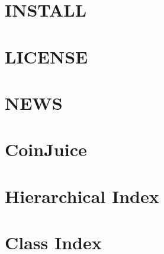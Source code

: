 \documentclass[twoside]{book}
\begin{document}
\chapter{I\-N\-S\-T\-A\-L\-L}
\label{md__i_n_s_t_a_l_l}
\hypertarget{md__i_n_s_t_a_l_l}{}

\chapter{L\-I\-C\-E\-N\-S\-E}
\label{md__l_i_c_e_n_s_e}
\hypertarget{md__l_i_c_e_n_s_e}{}

\chapter{N\-E\-W\-S}
\label{md__n_e_w_s}
\hypertarget{md__n_e_w_s}{}

\chapter{Coin\-Juice}
\label{md__r_e_a_d_m_e}
\hypertarget{md__r_e_a_d_m_e}{}

\chapter{Hierarchical Index}

\chapter{Class Index}

\end{document}
